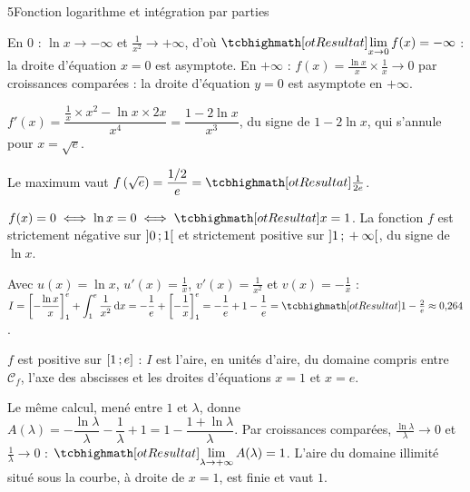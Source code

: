 \begin{corrigeBac}{5}{Fonction logarithme et intégration par parties}
\begin{questions}
  \item En $0$ : $\ln x\to-\infty$ et $\frac1{x^{2}}\to+\infty$, d'où $\res{\lim\limits_{x\to0}f(x)=-\infty}$ : la droite d'équation
    $x=0$ est asymptote. En $+\infty$ : $f(x)=\frac{\ln x}{x}\times\frac1x\to0$ par croissances comparées : la droite d'équation $y=0$
    est asymptote en $+\infty$. \pts{1 pt}
  \item $f'(x)=\dfrac{\frac1x\times x^{2}-\ln x\times2x}{x^{4}}=\dfrac{1-2\ln x}{x^{3}}$, du signe de $1-2\ln x$, qui s'annule pour
    $x=\sqrt e$.
\begin{center}
\begin{tableau}
\end{tableau}
\end{center}
    Le maximum vaut $f\left(\sqrt e\right)=\dfrac{1/2}{e}=\res{\tfrac{1}{2e}}$. \pts{1 pt}
  \item $f(x)=0\iff\ln x=0\iff\res{x=1}$. La fonction $f$ est strictement négative sur $\mathopen{]}0\,{;}\,1\mathclose{[}$ et strictement positive sur
    $\mathopen{]}1\,{;}\,+\infty\mathclose{[}$, du signe de $\ln x$. 
\end{questions}
\begin{questions}[resume]
  \item Avec $u(x)=\ln x$, $u'(x)=\frac1x$, $v'(x)=\frac1{x^{2}}$ et $v(x)=-\frac1x$ :
    $I=\left[-\dfrac{\ln x}{x}\right]_1^{e}+\displaystyle\int_1^{e}\frac{1}{x^{2}}\,\mathrm{d}x=-\frac1e+\left[-\frac1x\right]_1^{e}
    =-\frac1e+1-\frac1e=\res{1-\tfrac2e}\approx0{,}264$. \pts{1 pt}
  \item $f$ est positive sur $\mathopen{[}1\,{;}\,e\mathclose{]}$ : $I$ est l'aire, en unités d'aire, du domaine compris entre $\mathcal{C}_f$, l'axe des
    abscisses et les droites d'équations $x=1$ et $x=e$. 
  \item Le même calcul, mené entre $1$ et $\lambda$, donne $A(\lambda)=-\dfrac{\ln\lambda}{\lambda}-\dfrac1\lambda+1=1-\dfrac{1+\ln\lambda}{\lambda}$.
    Par croissances comparées, $\frac{\ln\lambda}{\lambda}\to0$ et $\frac1\lambda\to0$ : $\res{\lim\limits_{\lambda\to+\infty}A(\lambda)=1}$.
    L'aire du domaine illimité situé sous la courbe, à droite de $x=1$, est finie et vaut $1$. \pts{1 pt}
\end{questions}
\end{corrigeBac}
